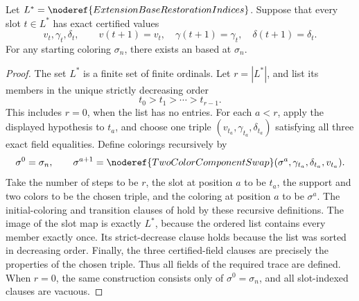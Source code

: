 \begin{helper}
Let \(L^*=\noderef{ExtensionBaseRestorationIndices}\). Suppose that every
slot \(t\in L^*\) has exact certified values
\[
  v_t,\gamma_t,\delta_t,\qquad
  v(t+1)=v_t,\quad \gamma(t+1)=\gamma_t,\quad
  \delta(t+1)=\delta_t.
\]
For any starting coloring \(\sigma_n\), there exists an
 based at \(\sigma_n\).
\end{helper}
\begin{proof}
The set \(L^*\) is a finite set of finite ordinals. Let \(r=|L^*|\), and
list its members in the unique strictly decreasing order
\[
                         t_0>t_1>\cdots>t_{r-1}.
\]
This includes \(r=0\), when the list has no entries. For each \(a<r\),
apply the displayed hypothesis to \(t_a\), and choose one triple
\((v_{t_a},\gamma_{t_a},\delta_{t_a})\) satisfying all three exact field
equalities. Define colorings recursively by
\[
 \sigma^0=\sigma_n,\qquad
 \sigma^{a+1}=\noderef{TwoColorComponentSwap}
   (\sigma^a,\gamma_{t_a},\delta_{t_a},v_{t_a}).
\]
Take the number of steps to be \(r\), the slot at position \(a\) to be
\(t_a\), the support and two colors to be the chosen triple, and the coloring
at position \(a\) to be \(\sigma^a\). The initial-coloring and transition
clauses of  hold by these recursive
definitions. The image of the slot map is exactly \(L^*\), because the
ordered list contains every member exactly once. Its strict-decrease clause
holds because the list was sorted in decreasing order. Finally, the three
certified-field clauses are precisely the properties of the chosen triple.
Thus all fields of the required trace are defined. When \(r=0\), the same
construction consists only of \(\sigma^0=\sigma_n\), and all slot-indexed
clauses are vacuous.
\end{proof}
